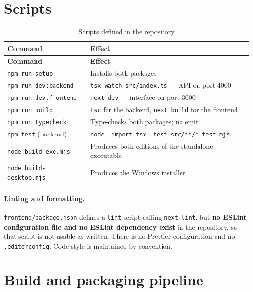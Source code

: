 \documentclass[11pt,a4paper]{report}
\newcommand{\code}[1]{\texttt{\small #1}}
\DeclareRobustCommand{\file}[1]{{\small\nolinkurl{#1}}}
\begin{document}
\section{Scripts}

\begin{longtable}{@{}>{\raggedright\arraybackslash}p{5.2cm}>{\raggedright\arraybackslash}p{9.5cm}@{}}
\caption{Scripts defined in the repository}\label{tab:scripts}\\
\toprule
\textbf{Command} & \textbf{Effect}\\
\midrule
\endfirsthead
\toprule
\textbf{Command} & \textbf{Effect}\\
\midrule
\endhead
\bottomrule
\endfoot
\code{npm run setup}             & Installs both packages\\
\code{npm run dev:backend}       & \code{tsx watch src/index.ts} --- API on port 4000\\
\code{npm run dev:frontend}      & \code{next dev} --- interface on port 3000\\
\code{npm run build}             & \code{tsc} for the backend, \code{next build} for the frontend\\
\code{npm run typecheck}         & Type-checks both packages; no emit\\
\code{npm test} (backend)        & \code{node --import tsx --test src/**/*.test.mjs}\\
\code{node build-exe.mjs}        & Produces both editions of the standalone executable\\
\code{node build-desktop.mjs}    & Produces the Windows installer\\
\end{longtable}

\paragraph{Linting and formatting.} \file{frontend/package.json} defines a
\code{lint} script calling \code{next lint}, but \textbf{no ESLint configuration
file and no ESLint dependency exist} in the repository, so that script is not
usable as written. There is no Prettier configuration and no \file{.editorconfig}.
Code style is maintained by convention.

\section{Build and packaging pipeline}
\end{document}
